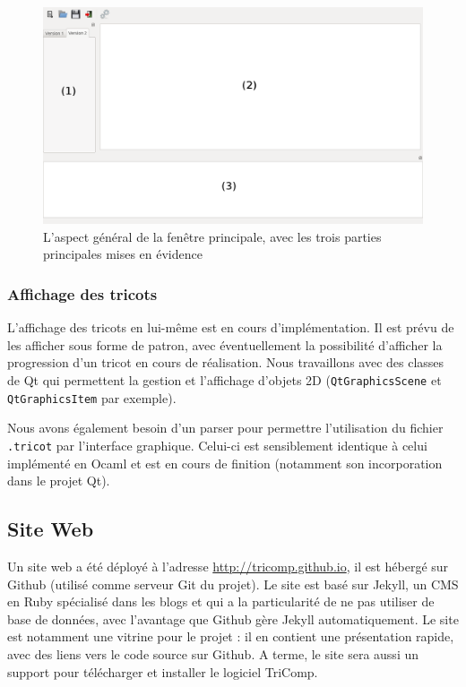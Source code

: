 \documentclass{article}
\begin{document}
\begin{figure}[!ht]
  \begin{center}
    \includegraphics[scale=0.3]{fenetre.png}
  \end{center}
  \caption{L'aspect général de la fenêtre principale, avec les trois parties principales mises en évidence}
  \label{fenetre}
\end{figure}

\subsubsection{Affichage des tricots}

L'affichage des tricots en lui-même est en cours d'implémentation. Il est prévu de les afficher sous forme de patron, avec éventuellement
la possibilité d'afficher la progression d'un tricot en cours de réalisation.
Nous travaillons avec des classes de Qt qui permettent la gestion et l'affichage d'objets 2D (\texttt{QtGraphicsScene} et \texttt
{QtGraphicsItem} par exemple).

Nous avons également besoin d'un parser pour permettre l'utilisation du fichier \texttt{.tricot} par l'interface graphique. Celui-ci est 
sensiblement identique à celui implémenté en Ocaml et est en cours de finition (notamment son incorporation dans le projet Qt).

\subsection{Site Web}

Un site web a été déployé à l'adresse \url{http://tricomp.github.io}, il est hébergé sur Github (utilisé comme serveur Git du projet). Le
site est basé sur Jekyll, un CMS en Ruby spécialisé dans les blogs et qui a la particularité de ne pas utiliser de base de données, avec
l'avantage que Github gère Jekyll automatiquement. Le site est notamment une vitrine pour le projet : il en contient une présentation
rapide, avec des liens vers le code source sur Github. A terme, le site sera aussi un support pour télécharger et installer le logiciel
TriComp.
\end{document}
